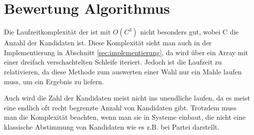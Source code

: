 \section{Bewertung Algorithmus}
\label{sec:Bewertung2}

Die Laufzeitkomplexität der \schulze ist mit $O(C^3)$ nicht besonders gut, wobei C die Anzahl der Kandidaten ist. Diese Komplexität sieht man auch in der Implementierung in Abschnitt \ref{sec:implementierung}, da wird über ein Array mit einer dreifach verschachtelten Schleife iteriert. Jedoch ist die Laufzeit zu relativieren, da diese Methode zum auswerten einer Wahl nur ein Mahle laufen muss, um ein Ergebnis zu liefern.

Auch wird die Zahl der Kandidaten meist nicht ins unendliche laufen, da es meist eine endlich oft recht begrenzte Anzahl von Kandidaten gibt. Trotzdem muss man die Komplexität beachten, wenn man sie in Systeme einbaut, die nicht eine klassische Abstimmung von Kandidaten wie es z.B. bei Partei darstellt.



